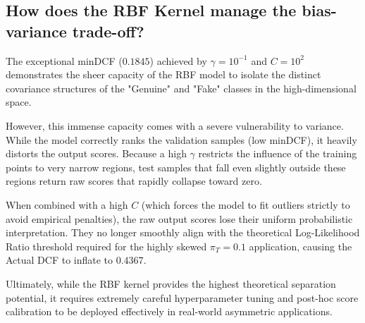 \subsection*{How does the RBF Kernel manage the bias-variance trade-off?}

The exceptional minDCF ($0.1845$) achieved by $\gamma = 10^{-1}$ and $C=10^2$ demonstrates the sheer capacity of the RBF model to isolate the distinct covariance structures of the "Genuine" and "Fake" classes in the high-dimensional space.

However, this immense capacity comes with a severe vulnerability to variance. While the model correctly ranks the validation samples (low minDCF), it heavily distorts the output scores. Because a high $\gamma$ restricts the influence of the training points to very narrow regions, test samples that fall even slightly outside these regions return raw scores that rapidly collapse toward zero. 

When combined with a high $C$ (which forces the model to fit outliers strictly to avoid empirical penalties), the raw output scores lose their uniform probabilistic interpretation. They no longer smoothly align with the theoretical Log-Likelihood Ratio threshold required for the highly skewed $\pi_T = 0.1$ application, causing the Actual DCF to inflate to $0.4367$. 

Ultimately, while the RBF kernel provides the highest theoretical separation potential, it requires extremely careful hyperparameter tuning and post-hoc score calibration to be deployed effectively in real-world asymmetric applications.